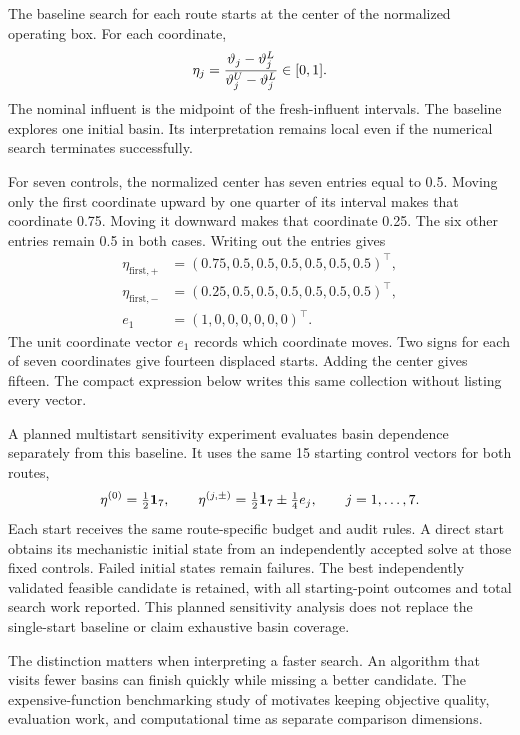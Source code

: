 The baseline search for each route starts at the center of the normalized operating box. For each coordinate,
\begin{equation}
\equationname{Operating-control normalization to the unit interval}
\eta_j=\frac{\vartheta_j-\vartheta_j^L}{\vartheta_j^U-\vartheta_j^L}\in[0,1].
\label{eq:plant_normalized_controls}
\end{equation}
The nominal influent is the midpoint of the fresh-influent intervals. The baseline explores one initial basin. Its interpretation remains local even if the numerical search terminates successfully.

For seven controls, the normalized center has seven entries equal to 0.5. Moving only the first coordinate upward by one quarter of its interval makes that coordinate 0.75. Moving it downward makes that coordinate 0.25. The six other entries remain 0.5 in both cases. Writing out the entries gives
\[
\begin{aligned}
\eta_{\mathrm{first},+}&=(0.75,0.5,0.5,0.5,0.5,0.5,0.5)^\top,\\
\eta_{\mathrm{first},-}&=(0.25,0.5,0.5,0.5,0.5,0.5,0.5)^\top,\\
e_1&=(1,0,0,0,0,0,0)^\top.
\end{aligned}
\]
The unit coordinate vector $e_1$ records which coordinate moves. Two signs for each of seven coordinates give fourteen displaced starts. Adding the center gives fifteen. The compact expression below writes this same collection without listing every vector.

A planned multistart sensitivity experiment evaluates basin dependence separately from this baseline. It uses the same 15 starting control vectors for both routes,
\begin{equation}
\equationname{Common center and displaced starts for the multistart comparison}
\eta^{(0)}=\tfrac12\mathbf1_7,\qquad
\eta^{(j,\pm)}=\tfrac12\mathbf1_7\pm\tfrac14e_j,
\qquad j=1,\ldots,7.
\label{eq:plant_multistart_design}
\end{equation}
Each start receives the same route-specific budget and audit rules. A direct start obtains its mechanistic initial state from an independently accepted solve at those fixed controls. Failed initial states remain failures. The best independently validated feasible candidate is retained, with all starting-point outcomes and total search work reported. This planned sensitivity analysis does not replace the single-start baseline or claim exhaustive basin coverage.

The distinction matters when interpreting a faster search. An algorithm that visits fewer basins can finish quickly while missing a better candidate. The expensive-function benchmarking study of \citet{Bliek2023} motivates keeping objective quality, evaluation work, and computational time as separate comparison dimensions.

